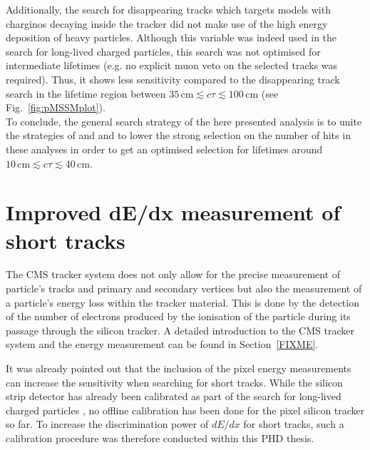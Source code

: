 Additionally, the search for disappearing tracks which targets models with charginos decaying inside the tracker did not make use of the high energy deposition of heavy particles. 
Although this variable was indeed used in the search for long-lived charged particles, this search was not optimised for intermediate lifetimes (e.g. no explicit muon veto on the selected tracks was required). 
Thus, it shows less sensitivity compared to the disappearing track search in the lifetime region between $35\,\text{cm} \lesssim c\tau \lesssim 100\,\text{cm}$ (see Fig.~\ref{fig:pMSSMplot}).\\

To conclude, the general search strategy of the here presented analysis is to unite the strategies of \cite{bib:CMS:HSCP_8TeV} and \cite{bib:CMS:DT_8TeV} and to lower the strong selection on the number of hits in these analyses in order to get an optimised selection for lifetimes around $10\,\text{cm} \lesssim c\tau \lesssim  40\,\text{cm}$.

\chapter{Improved dE/dx measurement of short tracks}
\label{sec:DeDxMeasurement}
The CMS tracker system does not only allow for the precise measurement of particle's tracks and primary and secondary vertices but also the measurement of a particle's energy loss within the tracker material.
This is done by the detection of the number of electrons produced by the ionisation of the particle during its passage through the silicon tracker.
A detailed introduction to the CMS tracker system and the energy measurement can be found in Section~\ref{FIXME}.

It was already pointed out that the inclusion of the pixel energy measurements can increase the sensitivity when searching for short tracks.
While the silicon strip detector has already been calibrated as part of the search for long-lived charged particles \cite{bib:CMS:HSCP_8TeV}, no offline calibration has been done for the pixel silicon tracker so far.
To increase the discrimination power of $dE/dx$ for short tracks, such a calibration procedure was therefore conducted within this PHD thesis.


